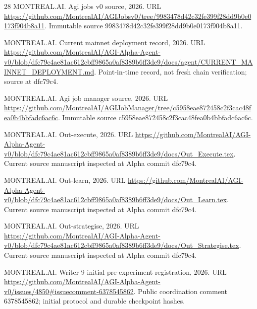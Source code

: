 \documentclass[11pt,a4paper]{article}
\begin{document}
\begin{thebibliography}{28}
{MONTREAL.AI}.
\newblock Agi jobs v0 source, 2026{}.
\newblock URL
  \url{https://github.com/MontrealAI/AGIJobsv0/tree/9983478d42c32fe399f28dd9b0e0173f904b8a11}.
\newblock Immutable source 9983478d42c32fe399f28dd9b0e0173f904b8a11.

{MONTREAL.AI}.
\newblock Current mainnet deployment record, 2026{}.
\newblock URL
  \url{https://github.com/MontrealAI/AGI-Alpha-Agent-v0/blob/dfc79c4ae81ac612cbff9865a0af8389b6ff3de9/docs/agent/CURRENT_MAINNET_DEPLOYMENT.md}.
\newblock Point-in-time record, not fresh chain verification; source at
  dfc79c4.

{MONTREAL.AI}.
\newblock Agi job manager source, 2026{}.
\newblock URL
  \url{https://github.com/MontrealAI/AGIJobManager/tree/c5958eae872458c2f3cac48fea0b4bbfadc6ac6c}.
\newblock Immutable source c5958eae872458c2f3cac48fea0b4bbfadc6ac6c.

{MONTREAL.AI}.
\newblock Out-execute, 2026{}.
\newblock URL
  \url{https://github.com/MontrealAI/AGI-Alpha-Agent-v0/blob/dfc79c4ae81ac612cbff9865a0af8389b6ff3de9/docs/Out_Execute.tex}.
\newblock Current source manuscript inspected at Alpha commit dfc79c4.

{MONTREAL.AI}.
\newblock Out-learn, 2026{}.
\newblock URL
  \url{https://github.com/MontrealAI/AGI-Alpha-Agent-v0/blob/dfc79c4ae81ac612cbff9865a0af8389b6ff3de9/docs/Out_Learn.tex}.
\newblock Current source manuscript inspected at Alpha commit dfc79c4.

{MONTREAL.AI}.
\newblock Out-strategise, 2026{}.
\newblock URL
  \url{https://github.com/MontrealAI/AGI-Alpha-Agent-v0/blob/dfc79c4ae81ac612cbff9865a0af8389b6ff3de9/docs/Out_Strategise.tex}.
\newblock Current source manuscript inspected at Alpha commit dfc79c4.

{MONTREAL.AI}.
\newblock Writer 9 initial pre-experiment registration, 2026{}.
\newblock URL
  \url{https://github.com/MontrealAI/AGI-Alpha-Agent-v0/issues/4850#issuecomment-6378545862}.
\newblock Public coordination comment 6378545862; initial protocol and durable
  checkpoint hashes.


\end{thebibliography}
\end{document}
